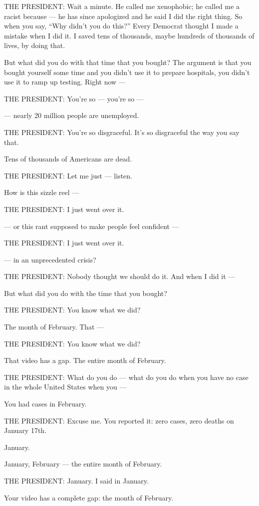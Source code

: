 THE PRESIDENT: Wait a minute. He called me xenophobic; he called me a
racist because --- he has since apologized and he said I did the right
thing. So when you say, ``Why didn't you do this?'' Every Democrat
thought I made a mistake when I did it. I saved tens of thousands, maybe
hundreds of thousands of lives, by doing that.

But what did you do with that time that you bought? The argument is that
you bought yourself some time and you didn't use it to prepare
hospitals, you didn't use it to ramp up testing. Right now ---

THE PRESIDENT: You're so --- you're so ---

--- nearly 20 million people are unemployed.

THE PRESIDENT: You're so disgraceful. It's so disgraceful the way you
say that.

Tens of thousands of Americans are dead.

THE PRESIDENT: Let me just --- listen.

How is this sizzle reel ---

THE PRESIDENT: I just went over it.

--- or this rant supposed to make people feel confident ---

THE PRESIDENT: I just went over it.

--- in an unprecedented crisis?

THE PRESIDENT: Nobody thought we should do it. And when I did it ---

But what did you do with the time that you bought?

THE PRESIDENT: You know what we did?

The month of February. That ---

THE PRESIDENT: You know what we did?

That video has a gap. The entire month of February.

THE PRESIDENT: What do you do --- what do you do when you have no case
in the whole United States when you ---

You had cases in February.

THE PRESIDENT: Excuse me. You reported it: zero cases, zero deaths on
January 17th.

January.

January, February --- the entire month of February.

THE PRESIDENT: January. I said in January.

Your video has a complete gap: the month of February.

